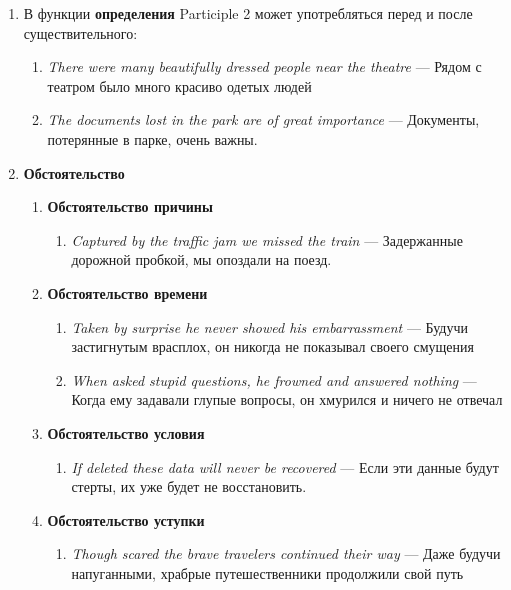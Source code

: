 \documentclass{article}
\begin{document}
\begin{enumerate}
	\item В функции \textbf{определения} Participle 2 может употребляться перед и после существительного:
	\begin{enumerate}
		\item \emph{There were many beautifully dressed people near the theatre} — Рядом с театром было много красиво одетых людей
		\item \emph{The documents lost in the park are of great importance} — Документы, потерянные в парке, очень важны.
	\end{enumerate}
	\item \textbf{Обстоятельство}
	\begin{enumerate}
		\item \textbf{Обстоятельство причины}
		\begin{enumerate}
			\item \emph{Captured by the traffic jam we missed the train} — Задержанные дорожной пробкой, мы опоздали на поезд.
		\end{enumerate}
		\item \textbf{Обстоятельство времени}
		\begin{enumerate}
			\item \emph{Taken by surprise he never showed his embarrassment} — Будучи застигнутым врасплох, он никогда не показывал своего смущения
			\item \emph{When asked stupid questions, he frowned and answered nothing} — Когда ему задавали глупые вопросы, он хмурился и ничего не отвечал
		\end{enumerate}
		\item \textbf{Обстоятельство условия}
		\begin{enumerate}
			\item \emph{If deleted these data will never be recovered} — Если эти данные будут стерты, их уже будет не восстановить.
		\end{enumerate}
		\item \textbf{Обстоятельство уступки}
		\begin{enumerate}
			\item \emph{Though scared the brave travelers continued their way} — Даже будучи напуганными, храбрые путешественники продолжили свой путь
		\end{enumerate}
	\end{enumerate}
\end{enumerate}
\end{document}
